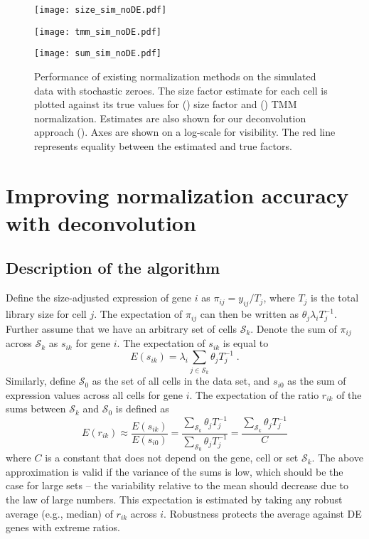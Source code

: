 \documentclass{article}
\begin{document}
\begin{figure}[tb]
\begin{minipage}{0.33\textwidth}
\texttt{[image: size\_sim\_noDE.pdf]}
\subcaption{}\label{subfig:size_noDE}
\end{minipage}
\begin{minipage}{0.33\textwidth}
\texttt{[image: tmm\_sim\_noDE.pdf]}
\subcaption{}\label{subfig:tmm_noDE}
\end{minipage}
\begin{minipage}{0.33\textwidth}
\texttt{[image: sum\_sim\_noDE.pdf]}
\subcaption{}\label{subfig:sum_noDE}
\end{minipage}
\caption{
    Performance of existing normalization methods on the simulated data with stochastic zeroes.
    The size factor estimate for each cell is plotted against its true values for () size factor and () TMM normalization.
    Estimates are also shown for our deconvolution approach ().
    Axes are shown on a log-scale for visibility.
    The red line represents equality between the estimated and true factors.
}
\label{fig:sim_noDE}
\end{figure}

\section{Improving normalization accuracy with deconvolution}

\subsection{Description of the algorithm}
Define the size-adjusted expression of gene $i$ as $\pi_{ij} = y_{ij}/T_j$, where $T_j$ is the total library size for cell $j$.
The expectation of $\pi_{ij}$ can then be written as $\theta_j\lambda_i T_j^{-1}$.
Further assume that we have an arbitrary set of cells $\mathcal{S}_k$.
Denote the sum of $\pi_{ij}$ across $\mathcal{S}_k$ as $s_{ik}$ for gene $i$.
The expectation of $s_{ik}$ is equal to 
\[
    E(s_{ik}) = \lambda_i \sum_{j \in \mathcal{S}_k} \theta_j T_j^{-1}\;.
\]
Similarly, define $\mathcal{S}_0$ as the set of all cells in the data set, and $s_{i0}$ as the sum of expression values across all cells for gene $i$.
The expectation of the ratio $r_{ik}$ of the sums between $\mathcal{S}_k$ and $\mathcal{S}_0$ is defined as
\begin{equation}
    E(r_{ik}) \approx \frac{E(s_{ik})}{E(s_{i0})} 
    = \frac{\sum_{\mathcal{S}_k} \theta_j T_j^{-1}}{\sum_{\mathcal{S}_0} \theta_j T_j^{-1}} 
    = \frac{\sum_{\mathcal{S}_k} \theta_j T_j^{-1}}{C}
    \label{eqn:linear_single}
\end{equation}
where $C$ is a constant that does not depend on the gene, cell or set $\mathcal{S}_k$.
The above approximation is valid if the variance of the sums is low, which should be the case for large sets 
    -- the variability relative to the mean should decrease due to the law of large numbers.
This expectation is estimated by taking any robust average (e.g., median) of $r_{ik}$ across $i$.
Robustness protects the average against DE genes with extreme ratios.
\end{document}
